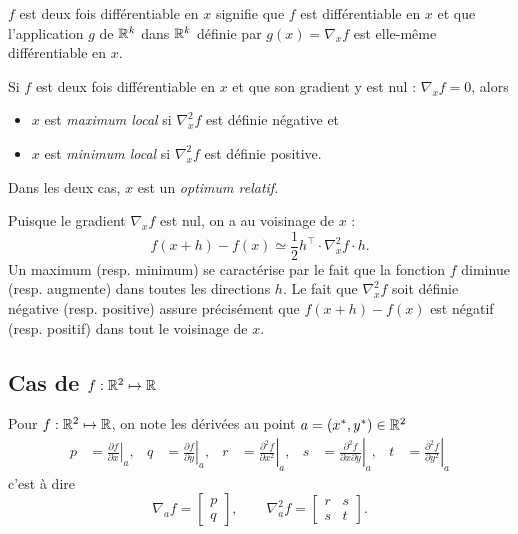 \remark
$f$ est deux fois différentiable en $x$ signifie que $f$ est différentiable en $x$ et que l'application $g$ de $\mathbb{R}^k$ dans $\mathbb{R}^k$ définie par $g(x) = \nabla_x f$ est elle-même différentiable en $x$.

\begin{definition}
  Si $f$ est deux fois différentiable en $x$ et que son gradient y est nul : $\nabla_xf = 0$, alors
  \begin{itemize}
   \item $x$ est {\em maximum local} si $\nabla^2_x f$ est définie négative et
   \item $x$ est {\em minimum local} si $\nabla^2_x f$ est définie positive.
  \end{itemize}
  Dans les deux cas, $x$ est un {\em optimum relatif}.
\end{definition}

\remark
Puisque le gradient $\nabla_x f$ est nul, on a au voisinage de $x$ :
$$
f(x+h) - f(x) \simeq \frac12 h^\top \cdot \nabla^2_x f \cdot h.
$$
Un maximum (resp. minimum) se caractérise par le fait que la fonction $f$ diminue (resp. augmente) dans toutes les directions $h$. Le fait que $\nabla^2_x f$ soit définie négative (resp. positive) assure précisément que $f(x+h) - f(x)$ est négatif (resp. positif) dans tout le voisinage de $x$.

\subsection*{Cas de $f : \mathbb{R}^2 \mapsto \mathbb{R}$}

\begin{definition*}
  Pour $f : \mathbb{R}^2 \mapsto \mathbb{R}$, on note les dérivées au point $a = (x^*, y^*) \in \mathbb{R}^2$
  \begin{align*}
    p & = \left.\frac{\partial f}{\partial x}\right|_a, &
    q & = \left.\frac{\partial f}{\partial y}\right|_a, &
    r & = \left.\frac{\partial^2 f}{\partial x^2}\right|_a, &
    s & = \left.\frac{\partial^2 f}{\partial x \partial y}\right|_a, &
    t & = \left.\frac{\partial^2 f}{\partial y^2}\right|_a
  \end{align*}
  c'est à dire
  $$
  \nabla_af = \left[\begin{array}{c} p \\ q \end{array} \right], 
  \qquad 
  \nabla^2_af = \left[\begin{array}{cc} r & s \\ s & t \end{array} \right].
  $$
\end{definition*}

